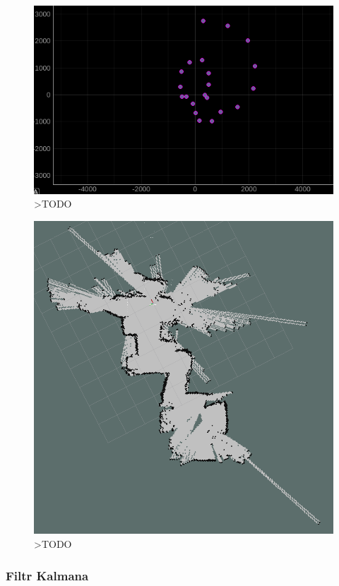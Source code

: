 \begin{figure}[ht]
	\centering
		\includegraphics[width=0.8\linewidth]{rys/calibrated-mag-high-interference-broken-rotation.PNG}
	\caption{>TODO}
	\label{fig:xxx}
\end{figure}

\begin{figure}[ht]
	\centering
		\includegraphics[width=0.8\linewidth]{rys/2020-11-04-170347_1920x1080_scrot.PNG}
	\caption{>TODO}
	\label{fig:xxx}
\end{figure}




\subsubsection{Filtr Kalmana}
\label{sec:kalman}



